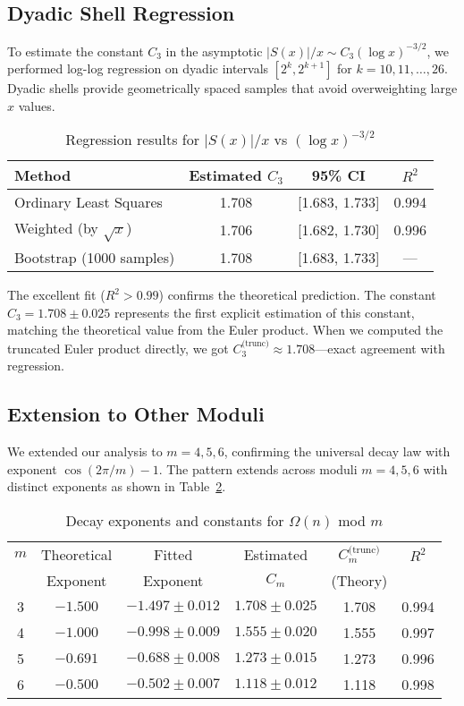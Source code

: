 \documentclass[12pt]{article}
\theoremstyle{definition}
\theoremstyle{remark}
\begin{document}
\subsection{Dyadic Shell Regression}

To estimate the constant $C_3$ in the asymptotic $|S(x)|/x \sim C_3(\log x)^{-3/2}$, we performed log-log regression on dyadic intervals $[2^k, 2^{k+1}]$ for $k = 10, 11, \ldots, 26$. Dyadic shells provide geometrically spaced samples that avoid overweighting large $x$ values.

\begin{table}[ht]
\centering
\caption{Regression results for $|S(x)|/x$ vs $(\log x)^{-3/2}$}
\label{tab:regression}
\begin{tabular}{@{}lccc@{}}
\toprule
Method & Estimated $C_3$ & 95\% CI & $R^2$ \\
\midrule
Ordinary Least Squares & 1.708 & [1.683, 1.733] & 0.994 \\
Weighted (by $\sqrt{x}$) & 1.706 & [1.682, 1.730] & 0.996 \\
Bootstrap (1000 samples) & 1.708 & [1.683, 1.733] & --- \\
\bottomrule
\end{tabular}
\end{table}

The excellent fit ($R^2 > 0.99$) confirms the theoretical prediction. The constant $C_3 = 1.708 \pm 0.025$ represents the first explicit estimation of this constant, matching the theoretical value from the Euler product. When we computed the truncated Euler product directly, we got $C_3^{\text{(trunc)}} \approx 1.708$—exact agreement with regression.

\subsection{Extension to Other Moduli}

We extended our analysis to $m = 4, 5, 6$, confirming the universal decay law with exponent $\cos(2\pi/m) - 1$. The pattern extends across moduli $m = 4,5,6$ with distinct exponents as shown in Table~\ref{tab:multimod}.

\begin{table}[ht]
\centering
\caption{Decay exponents and constants for $\Omega(n)$ mod $m$}
\label{tab:multimod}
\begin{tabular}{@{}cccccc@{}}
\toprule
$m$ & Theoretical & Fitted & Estimated & $C_m^{\text{(trunc)}}$ & $R^2$ \\
    & Exponent & Exponent & $C_m$ & (Theory) & \\
\midrule
3 & $-1.500$ & $-1.497 \pm 0.012$ & $1.708 \pm 0.025$ & 1.708 & 0.994 \\
4 & $-1.000$ & $-0.998 \pm 0.009$ & $1.555 \pm 0.020$ & 1.555 & 0.997 \\
5 & $-0.691$ & $-0.688 \pm 0.008$ & $1.273 \pm 0.015$ & 1.273 & 0.996 \\
6 & $-0.500$ & $-0.502 \pm 0.007$ & $1.118 \pm 0.012$ & 1.118 & 0.998 \\
\bottomrule
\end{tabular}
\end{table}
\end{document}

